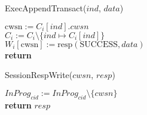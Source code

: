 \documentclass{article}
\begin{document}
\begin{procedure}[H]
  \caption{ExecAppendTransact($ind$, $data$)}
  $\text{cwsn} := C_i[ind].cwsn$\\
  $C_i := C_i \setminus \{ind \mapsto C_i[ind] \}$\\ 
  $W_i[\text{cwsn}] := \text{resp}(\text{SUCCESS}, data)$\\
  \textbf{return}
\end{procedure}
\begin{procedure}[H]
  \caption{SessionRespWrite($cwsn$, $resp$)}
  $InProg_{cid} := InProg_{cid}\setminus \{cwsn\}$\\
  \textbf{return} $resp$
\end{procedure} \newpage
\end{document}
